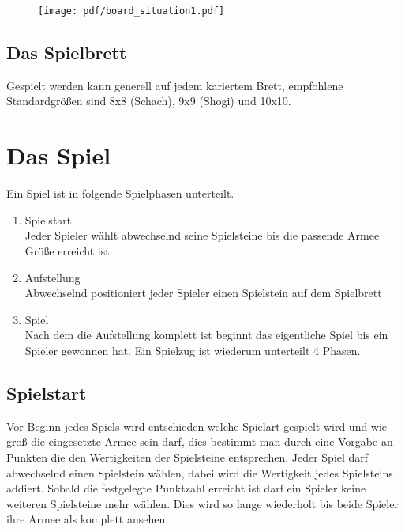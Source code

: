 \documentclass{article}
\begin{document}
	
	\begin{figure}[h]
	\texttt{[image: pdf/board\_situation1.pdf]}
	\end{figure}
	

	

\subsection{Das Spielbrett}
	Gespielt werden kann generell auf jedem kariertem Brett, empfohlene Standardgrößen sind
	8x8 (Schach), 9x9 (Shogi) und 10x10.
	

\section{Das Spiel}

	Ein Spiel ist in folgende Spielphasen unterteilt.

	\begin{enumerate}
	\item Spielstart \\
	 	  Jeder Spieler wählt abwechselnd seine Spielsteine bis die passende Armee Größe erreicht ist.
	\item Aufstellung \\
	  	  Abwechselnd positioniert jeder Spieler einen Spielstein auf dem Spielbrett
	\item Spiel \\
	  	  Nach dem die Aufstellung komplett ist beginnt das eigentliche Spiel bis ein Spieler gewonnen hat.
	  	  Ein Spielzug ist wiederum unterteilt 4 Phasen.
	\end{enumerate}


\subsection{Spielstart}
	Vor Beginn jedes Spiels wird entschieden welche Spielart gespielt wird und wie groß die eingesetzte Armee sein darf,
	dies bestimmt man durch eine Vorgabe an Punkten die den Wertigkeiten der Spielsteine entsprechen.
	Jeder Spiel darf abwechselnd einen Spielstein wählen, dabei wird die Wertigkeit jedes Spielsteins addiert.
	Sobald die festgelegte Punktzahl erreicht ist darf ein Spieler keine weiteren Spielsteine mehr wählen.
	Dies wird so lange wiederholt bis beide Spieler ihre Armee als komplett ansehen.
\end{document}
